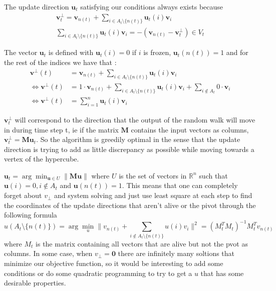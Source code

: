 \documentclass[12pt]{article}
\begin{document}
The update direction $\textbf{u}_t$ satisfying our conditions always exists because
\begin{align*}
        \textbf{v}^\perp_t = \textbf{v}_{n(t)} + \sum_{i \in A_t \setminus \{n(t)\}} \textbf{u}_t(i)\textbf{v}_i\\
        \sum_{i \in A_t \setminus \{n(t)\}} \textbf{u}_t(i)\textbf{v}_i = -(\textbf{v}_{n(t)} - \textbf{v}^\perp_t) \in V_t
\end{align*}

The vector $\textbf{u}_t$ is defined with $\textbf{u}_t(i)=0$ if $i$ is frozen, $\textbf{u}_t(n(t))=1$ and for the rest of the indices we have that :
\begin{align*}
\textbf{v}^\perp(t) &= \textbf{v}_{n(t)} + \sum_{i \in A_t \setminus \{n(t)\}} \textbf{u}_t(i)\textbf{v}_i\\
\Leftrightarrow \textbf{v}^\perp(t) &= 1 \cdot \textbf{v}_{n(t)} + \sum_{i \in A_t \setminus \{n(t)\}} \textbf{u}_t(i)\textbf{v}_i + \sum_{i \notin A_t} 0 \cdot \textbf{v}_i\\
\Leftrightarrow \textbf{v}^\perp(t) &= \sum_{i=1}^n \textbf{u}_t(i)\textbf{v}_i
\end{align*}

$\textbf{v}^\perp_t$ will correspond to the direction that the output of the random walk will move in during time step t, ie if the matrix $\textbf{M}$ contains the input vectors as columns, $\textbf{v}^\perp_t = \textbf{Mu}_t$. So the algorithm is greedily optimal in the sense that the update direction is trying to add as little discrepancy as possible while moving towards a vertex of the hypercube.

$\textbf{u}_t = \arg\min_{\textbf{u} \in U} \|\textbf{Mu}\|$ where $U$ is the set of vectors in $\mathbb{R}^n$ such that $\textbf{u}(i) = 0 , i \not\in A_t$ and $\textbf{u}(n(t))=1$. This means that one can completely forget about $v_\perp$ and system solving and just use least square at each step to find the coordinates of the update directions that aren't alive or the pivot through the following formula $$u(A_t\setminus\{n(t)\})=\arg\min_u\|v_{n(t)}+\sum_{i\not\in A_t\setminus\{n(t)\}}u(i)v_i\|^2=(M_t^TM_t)^{-1}M_t^Tv_{n(t)}$$ where $M_t$ is the matrix containing all vectors that are alive but not the pvot as columns. In some case, when $v_\perp=\textbf{0}$ there are infinitely many soltions that minimize our objective function, so it would be interesting to add some conditions or do some quadratic programming to try to get a $u$ that has some desirable properties.
\end{document}
